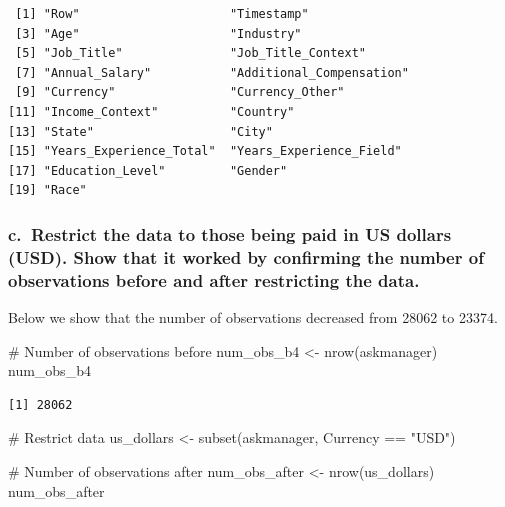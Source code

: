 \documentclass[
  letterpaper,
  DIV=11,
  numbers=noendperiod]{scrartcl}
\newenvironment{Shaded}{\begin{snugshade}}{\end{snugshade}}
\newcommand{\CommentTok}[1]{\textcolor[rgb]{0.37,0.37,0.37}{#1}}
\newcommand{\FunctionTok}[1]{\textcolor[rgb]{0.28,0.35,0.67}{#1}}
\newcommand{\NormalTok}[1]{\textcolor[rgb]{0.00,0.23,0.31}{#1}}
\newcommand{\OtherTok}[1]{\textcolor[rgb]{0.00,0.23,0.31}{#1}}
\newcommand{\SpecialCharTok}[1]{\textcolor[rgb]{0.37,0.37,0.37}{#1}}
\newcommand{\StringTok}[1]{\textcolor[rgb]{0.13,0.47,0.30}{#1}}
\begin{document}
\begin{verbatim}
 [1] "Row"                     "Timestamp"              
 [3] "Age"                     "Industry"               
 [5] "Job_Title"               "Job_Title_Context"      
 [7] "Annual_Salary"           "Additional_Compensation"
 [9] "Currency"                "Currency_Other"         
[11] "Income_Context"          "Country"                
[13] "State"                   "City"                   
[15] "Years_Experience_Total"  "Years_Experience_Field" 
[17] "Education_Level"         "Gender"                 
[19] "Race"                   
\end{verbatim}

\subsubsection{c.~Restrict the data to those being paid in US dollars
(USD). Show that it worked by confirming the number of observations
before and after restricting the
data.}\label{c.-restrict-the-data-to-those-being-paid-in-us-dollars-usd.-show-that-it-worked-by-confirming-the-number-of-observations-before-and-after-restricting-the-data.}

Below we show that the number of observations decreased from 28062 to
23374.

\begin{Shaded}
\begin{Highlighting}[]
\CommentTok{\# Number of observations before}
\NormalTok{num\_obs\_b4 }\OtherTok{\textless{}{-}} \FunctionTok{nrow}\NormalTok{(askmanager)}
\NormalTok{num\_obs\_b4}
\end{Highlighting}
\end{Shaded}

\begin{verbatim}
[1] 28062
\end{verbatim}

\begin{Shaded}
\begin{Highlighting}[]
\CommentTok{\# Restrict data}
\NormalTok{us\_dollars }\OtherTok{\textless{}{-}} \FunctionTok{subset}\NormalTok{(askmanager, Currency }\SpecialCharTok{==} \StringTok{"USD"}\NormalTok{)}

\CommentTok{\# Number of observations after}
\NormalTok{num\_obs\_after }\OtherTok{\textless{}{-}} \FunctionTok{nrow}\NormalTok{(us\_dollars)}
\NormalTok{num\_obs\_after}
\end{Highlighting}
\end{Shaded}
\end{document}
